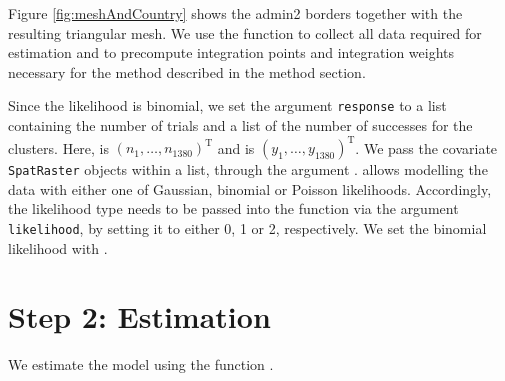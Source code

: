 Figure \ref{fig:meshAndCountry} shows the admin2 borders together with the resulting triangular mesh.
We use the function  to collect all data required for estimation and to precompute integration points and integration weights necessary for the method described in the method section.



Since the likelihood is binomial, we set the argument \texttt{response} to a list  containing the number of trials  and a list of the number of successes  for the clusters. Here,  is $(n_1, \ldots, n_{1380})^$ and  is $(y_1, \ldots, y_{1380})^$. We pass the covariate \texttt{SpatRaster} objects within a list, through the argument . 
 allows modelling the data with either one of Gaussian, binomial or Poisson likelihoods. Accordingly, the likelihood type needs to be passed into the function via the argument \texttt{likelihood}, by setting it to either 0, 1 or 2, respectively. We set the binomial likelihood with .



\section{Step 2: Estimation}
We estimate the model using the function . 

